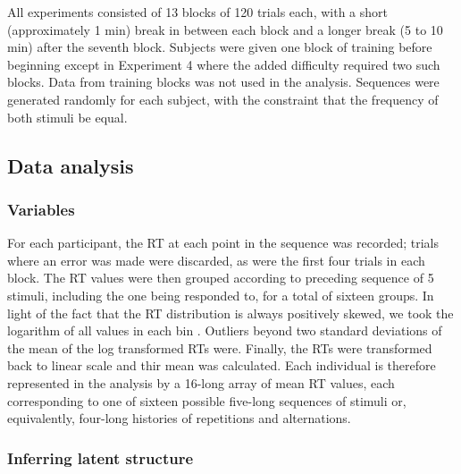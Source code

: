 \documentclass{apa}[12pt]
\begin{document}
All experiments consisted of 13 blocks of 120 trials each, with a short (approximately 1 min) break in between each block and a longer break (5 to 10 min) after the seventh block. Subjects were given one block of training before beginning except in Experiment 4 where the added difficulty required two such blocks. Data from training blocks was not used in the analysis. Sequences were generated randomly for each subject, with the constraint that the frequency of both stimuli be equal.

\subsection{Data analysis}

\subsubsection{Variables}

For each participant, the RT at each point in the sequence was recorded; trials where an error was made were discarded, as were the first four trials in each block. The RT values were then grouped according to preceding sequence of 5 stimuli, including the one being responded to, for a total of sixteen groups. In light of the fact that the RT distribution is always positively skewed, we took the logarithm of all values in each bin \cite{Ratcliff93}. Outliers beyond two standard deviations of the mean of the log transformed RTs were. Finally, the RTs were transformed back to linear scale and thir mean was calculated. Each individual is therefore represented in the analysis by a 16-long array of mean RT values, each corresponding to one of sixteen possible five-long sequences of stimuli or, equivalently, four-long histories of repetitions and alternations.

\subsubsection{Inferring latent structure}
\end{document}
